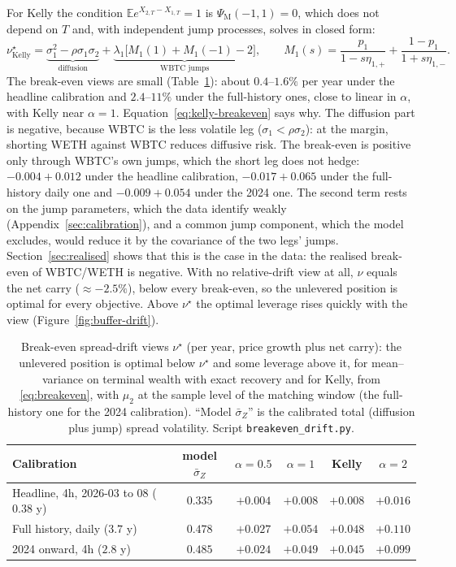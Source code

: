 \documentclass[11pt]{article}
\newcommand{\E}{\mathbb{E}}
\theoremstyle{plain}
\theoremstyle{definition}
\theoremstyle{remark}
\begin{document}
For Kelly the condition $\E e^{X_{2,T}-X_{1,T}}=1$ is $\Psi_{\mathrm M}(-1,1)=0$, which does not
depend on $T$ and, with independent jump processes, solves in closed form:
\begin{equation}\label{eq:kelly-breakeven}
\nu^\star_{\mathrm{Kelly}}=\underbrace{\sigma_1^2-\rho\sigma_1\sigma_2}_{\text{diffusion}}
+\underbrace{\lambda_1\bigl[M_1(1)+M_1(-1)-2\bigr]}_{\text{WBTC jumps}},
\qquad M_1(s)=\frac{p_1}{1-s\eta_{1,+}}+\frac{1-p_1}{1+s\eta_{1,-}}.
\end{equation}
The break-even views are small (Table~\ref{tab:thresholds}): about $0.4$--$1.6\%$ per year under the
headline calibration and $2.4$--$11\%$ under the full-history ones, close to linear in $\alpha$, with
Kelly near $\alpha=1$. Equation~\eqref{eq:kelly-breakeven} says why. The diffusion part is negative,
because WBTC is the less volatile leg ($\sigma_1<\rho\sigma_2$): at the margin, shorting WETH
against WBTC reduces diffusive risk. The break-even is positive only through WBTC's own jumps, which
the short leg does not hedge: $-0.004+0.012$ under the headline calibration, $-0.017+0.065$ under the
full-history daily one and $-0.009+0.054$ under the 2024 one. The second term rests on the
jump parameters, which the data identify weakly (Appendix~\ref{sec:calibration}), and a common jump
component, which the model excludes, would reduce it by the covariance of the two legs' jumps.
Section~\ref{sec:realised} shows that this is the case in the data: the realised break-even of
WBTC/WETH is negative. With no
relative-drift view at all, $\nu$ equals the net carry ($\approx-2.5\%$), below every break-even, so
the unlevered position is optimal for every objective. Above $\nu^\star$ the optimal leverage rises
quickly with the view (Figure~\ref{fig:buffer-drift}).

\begin{table}[ht]
\centering
\small
\begin{tabular}{lccccc}
\toprule
Calibration & model $\bar\sigma_Z$ & $\alpha=0.5$ & $\alpha=1$ & Kelly & $\alpha=2$ \\
\midrule
Headline, 4h, 2026-03 to 08 ($0.38$ y) & $0.335$ & $+0.004$ & $+0.008$ & $+0.008$ & $+0.016$ \\
Full history, daily ($3.7$ y) & $0.478$ & $+0.027$ & $+0.054$ & $+0.048$ & $+0.110$ \\
2024 onward, 4h ($2.8$ y) & $0.485$ & $+0.024$ & $+0.049$ & $+0.045$ & $+0.099$ \\
\bottomrule
\end{tabular}
\caption{Break-even spread-drift views $\nu^\star$ (per year, price growth plus net carry): the
unlevered position is optimal below $\nu^\star$ and some leverage above it, for mean--variance on
terminal wealth with exact recovery and for Kelly, from \eqref{eq:breakeven}, with $\mu_2$ at the
sample level of the matching window (the full-history one for the 2024 calibration). ``Model
$\bar\sigma_Z$'' is the calibrated total (diffusion plus jump) spread volatility. Script
\texttt{breakeven\_drift.py}.}
\label{tab:thresholds}
\end{table}
\end{document}
